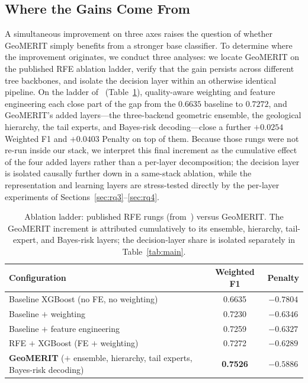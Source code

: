 \documentclass[bdcc,article,submit,pdftex,moreauthors]{Definitions/mdpi}
\begin{document}
\subsection{Where the Gains Come From}
\label{sec:rq2}
A simultaneous improvement on three axes raises the question of whether GeoMERIT simply
benefits from a stronger base classifier. To determine where the improvement originates, we
conduct three analyses: we locate GeoMERIT on the published RFE ablation ladder, verify that
the gain persists across different tree backbones, and isolate the decision layer within an
otherwise identical pipeline. On the ladder of~\cite{chen2026rfe} (Table~\ref{tab:ladder}),
quality-aware weighting and feature engineering each close part of the gap from the $0.6635$
baseline to $0.7272$, and GeoMERIT's added layers---the three-backend geometric ensemble, the
geological hierarchy, the tail experts, and Bayes-risk decoding---close a further $+0.0254$
Weighted F1 and $+0.0403$ Penalty on top of them. Because those rungs were not re-run inside
our stack, we interpret this final increment as the cumulative effect of the four added layers
rather than a per-layer decomposition; the decision layer is isolated causally further down in
a same-stack ablation, while the representation and learning layers are stress-tested directly
by the per-layer experiments of Sections~\ref{sec:rq3}--\ref{sec:rq4}.

\begin{table}[H]
\caption{Ablation ladder: published RFE rungs (from~\cite{chen2026rfe}) versus GeoMERIT. The
GeoMERIT increment is attributed cumulatively to its ensemble, hierarchy, tail-expert, and
Bayes-risk layers; the decision-layer share is isolated separately in
Table~\ref{tab:main}.\label{tab:ladder}}
\begin{tabularx}{\textwidth}{Xcc}
\toprule
\textbf{Configuration} & \textbf{Weighted F1} & \textbf{Penalty}\\
\midrule
Baseline XGBoost (no FE, no weighting) & 0.6635 & $-0.7804$\\
Baseline $+$ weighting & 0.7230 & $-0.6346$\\
Baseline $+$ feature engineering & 0.7259 & $-0.6327$\\
RFE $+$ XGBoost (FE $+$ weighting) & 0.7272 & $-0.6289$\\
\textbf{GeoMERIT} ($+$ ensemble, hierarchy, tail experts, Bayes-risk decoding) & \textbf{0.7526} & $\mathbf{-0.5886}$\\
\bottomrule
\end{tabularx}
\end{table}
\end{document}
